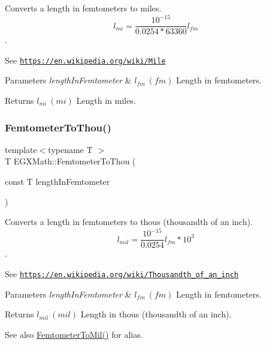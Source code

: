 Converts a length in femtometers to miles. \[ l_{mi}=\frac{10^{-15}}{0.0254 * 63360} l_{fm} \]. 

See \href{https://en.wikipedia.org/wiki/Mile}{\tt https\+://en.\+wikipedia.\+org/wiki/\+Mile} 
\begin{DoxyParams}{Parameters}
{\em length\+In\+Femtometer} & $ l_{fm}\ (fm)$ Length in femtometers. \\
\hline
\end{DoxyParams}
\begin{DoxyReturn}{Returns}
$ l_{mi}\ (mi)$ Length in miles. 
\end{DoxyReturn}
\mbox{\label{group___e_g_x_math-_conversions-_length_conversions-_femtometer-_imperial_ga5c277d07215ad164ba2ad94e25b02ff1}} 
\subsubsection{\texorpdfstring{Femtometer\+To\+Thou()}{FemtometerToThou()}}
{\footnotesize\ttfamily template$<$typename T $>$ \\
T E\+G\+X\+Math\+::\+Femtometer\+To\+Thou (\begin{DoxyParamCaption}\item[{const T}]{length\+In\+Femtometer }\end{DoxyParamCaption})}



Converts a length in femtometers to thous (thousandth of an inch). \[ l_{mil}= \frac{10^{-15}}{0.0254} l_{fm} * 10^{3} \]. 

See \href{https://en.wikipedia.org/wiki/Thousandth_of_an_inch}{\tt https\+://en.\+wikipedia.\+org/wiki/\+Thousandth\+\_\+of\+\_\+an\+\_\+inch} 
\begin{DoxyParams}{Parameters}
{\em length\+In\+Femtometer} & $ l_{fm}\ (fm)$ Length in femtometers. \\
\hline
\end{DoxyParams}
\begin{DoxyReturn}{Returns}
$ l_{mil}\ (mil)$ Length in thous (thousandth of an inch). 
\end{DoxyReturn}
\begin{DoxySeeAlso}{See also}
\mbox{\hyperlink{group___e_g_x_math-_conversions-_length_conversions-_femtometer-_imperial_gacfcd599a1c2c834f3bbb5f3f991d55df}{Femtometer\+To\+Mil()}} for alias. 
\end{DoxySeeAlso}
\mbox{\label{group___e_g_x_math-_conversions-_length_conversions-_femtometer-_imperial_ga4416c9d0cb07df4b86f23afe6b7f6e91}} 
